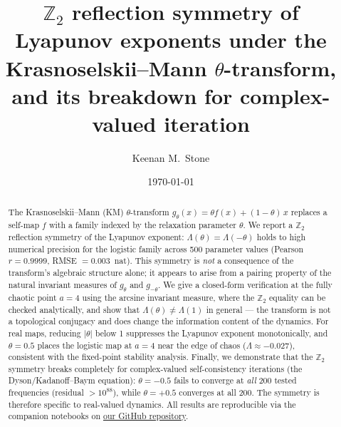\documentclass[aps,pre,twocolumn,superscriptaddress,nofootinbib,
               longbibliography,floatfix]{revtex4-2}
\newcommand{\param}{\theta}
\newcommand{\Lam}{\Lambda}
\newcommand{\KMdef}{g_{\param}(x) = \param f(x) + (1-\param)\,x}
\theoremstyle{plain}
\theoremstyle{remark}
\begin{document}

\title{$\mathbb{Z}_2$ reflection symmetry of Lyapunov exponents
       under the \mbox{Krasnoselskii--Mann} $\theta$-transform,
       and its breakdown for complex-valued iteration}

\author{Keenan M.~Stone}

\date{\today}

\begin{abstract}
The Krasnoselskii--Mann (KM) $\theta$-transform
$\KMdef$
replaces a self-map $f$ with a family indexed by the relaxation
parameter $\theta$.
We report a $\mathbb{Z}_2$ reflection symmetry of the Lyapunov
exponent: $\Lam(\theta) = \Lam(-\theta)$ holds to high numerical
precision for the logistic family across 500 parameter values
(Pearson $r = 0.9999$, RMSE $= 0.003$~nat).
This symmetry is \emph{not} a consequence of the transform's
algebraic structure alone; it appears to arise from a pairing
property of the natural invariant measures of $g_\theta$ and
$g_{-\theta}$.
We give a closed-form verification at the fully chaotic point
$a = 4$ using the arcsine invariant measure, where the
$\mathbb{Z}_2$ equality can be checked analytically, and show
that $\Lam(\theta) \neq \Lam(1)$ in general — the transform
is not a topological conjugacy and does change the information
content of the dynamics.
For real maps, reducing $|\theta|$ below 1 suppresses the
Lyapunov exponent monotonically, and $\theta = 0.5$ places the
logistic map at $a = 4$ near the edge of chaos
($\Lam \approx -0.027$), consistent with the fixed-point
stability analysis.
Finally, we demonstrate that the $\mathbb{Z}_2$ symmetry breaks
completely for complex-valued self-consistency iterations
(the Dyson/Kadanoff--Baym equation):
$\theta = -0.5$ fails to converge at \emph{all} 200 tested
frequencies (residual $> 10^{88}$), while $\theta = +0.5$
converges at all 200.
The symmetry is therefore specific to real-valued dynamics.
All results are reproducible via the companion notebooks on
\href{https://github.com/Keenan-M-Stone/Petrification}{our GitHub repository}.
\end{abstract}


\maketitle
\end{document}
